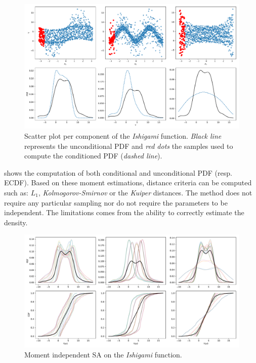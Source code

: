 \begin{figure}[!ht]
\centering
\includegraphics[width=\linewidth,keepaspectratio]{fig/literature/scatter_moments.pdf}
\caption{Scatter plot per component of the \textit{Ishigami} function. \emph{Black line} represents the unconditional PDF and \emph{red dots} the samples used to compute the conditioned PDF (\emph{dashed line}).}
\label{fig:scatter_moments}
\end{figure}

 shows the computation of both conditional and unconditional PDF (resp. ECDF). Based on these moment estimations, distance criteria can be computed such as: $L_1$, \emph{Kolmogorov-Smirnov} or the \emph{Kuiper} distances. The method does not require any particular sampling nor do not require the parameters to be independent. The limitations comes from the ability to correctly estimate the density.

\begin{figure}[!ht]
\centering
\includegraphics[width=\linewidth,keepaspectratio]{fig/literature/moment_independent-ishigami.pdf}
\caption{Moment independent SA on the \emph{Ishigami} function.}
\label{fig:moment_sa}
\end{figure}

